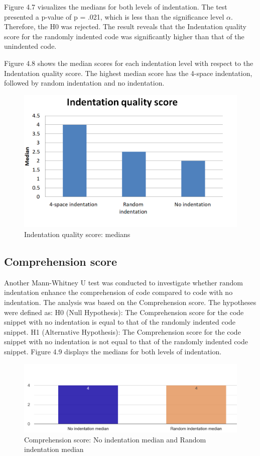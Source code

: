 Figure 4.7 visualizes the medians for both levels of indentation. 
The test presented a p-value of  p = .021, which is less than the significance level \(\alpha \). Therefore, the H0 was rejected. The result reveals that the Indentation quality score for the randomly indented code was significantly higher than that of the unindented code.

Figure 4.8 shows the median scores for each indentation level with respect to the Indentation quality score. The highest median score has the 4-space indentation, followed by random indentation and no indentation.

\begin{figure} [H]
  \centering
  \includegraphics[scale=0.96]{figures/indsM.png}
  \caption{Indentation quality score: medians}
  \label{fig:AnhangsChor}
\end{figure}


\subsection{Comprehension score}
Another Mann-Whitney U test was conducted to investigate whether random indentation enhance the comprehension  of code compared to code with no indentation. The analysis was based on the Comprehension score. The hypotheses were defined as: H0 (Null Hypothesis): The Comprehension score for the code snippet with no indentation is equal to that of the randomly indented code snippet. H1 (Alternative Hypothesis): The Comprehension score for the code snippet with no indentation is not equal to that of the randomly indented code snippet. Figure 4.9 displays the medians for both levels of indentation.



\begin{figure} [H]
  \centering
  \includegraphics[scale=0.55]{figures/0-r-q3.png}
  \caption{Comprehension score:  No indentation median and Random indentation median}
  \label{fig:AnhangsChor}
\end{figure}

